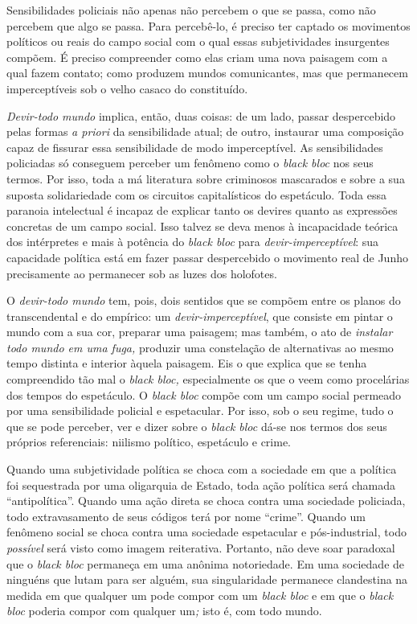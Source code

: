 Sensibilidades policiais não apenas não percebem o que se passa, como
não percebem que algo se passa. Para percebê-lo, é preciso ter captado
os movimentos políticos ou reais do campo social com o qual essas
subjetividades insurgentes compõem. É preciso compreender como elas
criam uma nova paisagem com a qual fazem contato; como produzem mundos
comunicantes, mas que permanecem imperceptíveis sob o velho casaco do
constituído.

\emph{Devir-todo mundo} implica, então, duas coisas: de um lado, passar
despercebido pelas formas \emph{a priori }da sensibilidade atual; de
outro, instaurar uma composição capaz de fissurar essa sensibilidade de
modo imperceptível. As sensibilidades policiadas só conseguem perceber
um fenômeno como o \emph{black bloc} nos seus termos. Por isso, toda a
má literatura sobre criminosos mascarados e sobre a sua suposta
solidariedade com os circuitos capitalísticos do espetáculo. Toda essa
paranoia intelectual é incapaz de explicar tanto os devires quanto as
expressões concretas de um campo social. Isso talvez se deva menos à
incapacidade teórica dos intérpretes e mais à potência do \emph{black
bloc }para \emph{devir-imperceptível}: sua capacidade política está em
fazer passar despercebido o movimento real de Junho precisamente ao
permanecer sob as luzes dos holofotes.

O \emph{devir-todo mundo} tem, pois, dois sentidos que se compõem entre
os planos do transcendental e do empírico: um
\emph{devir-imperceptível}, que consiste em pintar o mundo com a sua
cor, preparar uma paisagem; mas também, o ato de \emph{instalar todo
mundo em uma fuga, }produzir uma constelação de alternativas ao mesmo
tempo distinta e interior àquela paisagem. Eis o que explica que se
tenha compreendido tão mal o \emph{black bloc, }especialmente os que o
veem como procelárias dos tempos do espetáculo. O \emph{black bloc}
compõe com um campo social permeado por uma sensibilidade policial e
espetacular. Por isso, sob o seu regime, tudo o que se pode perceber,
ver e dizer sobre o \emph{black bloc} dá-se nos termos dos seus próprios
referenciais: niilismo político, espetáculo e crime.

Quando uma subjetividade política se choca com a sociedade em que a
política foi sequestrada por uma oligarquia de Estado, toda ação
política será chamada ``antipolítica''. Quando uma ação direta se choca
contra uma sociedade policiada, todo extravasamento de seus códigos terá
por nome ``crime''. Quando um fenômeno social se choca contra uma
sociedade espetacular e pós-industrial, todo\emph{ possível }será visto
como imagem reiterativa. Portanto, não deve soar paradoxal que o
\emph{black bloc }permaneça em uma anônima notoriedade. Em uma sociedade
de ninguéns que lutam para ser alguém, sua singularidade permanece
clandestina na medida em que qualquer um pode compor com um \emph{black
bloc }e em que o \emph{black bloc }poderia compor com qualquer um\emph{;
}isto é, com todo mundo.

